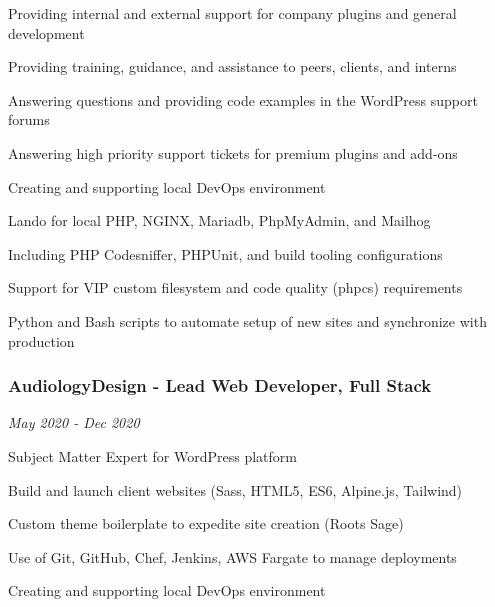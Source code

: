 \documentclass{article}
\newenvironment{narrow_list}{
	\begin{itemize}
		\setlength{\itemsep}{0pt}
		\setlength{\parskip}{-1pt}
		\setlength{\parsep}{0pt}
	}{\end{itemize}
}
\begin{document}
	Providing internal and external support for company plugins and general development 

	\begin{narrow_list}
		\item Providing training, guidance, and assistance to peers, clients, and interns
		\item Answering questions and providing code examples in the WordPress support forums
		\item Answering high priority support tickets for premium plugins and add-ons
	\end{narrow_list}

	Creating and supporting local DevOps environment

	\begin{narrow_list}
		\item Lando for local PHP, NGINX, Mariadb, PhpMyAdmin, and Mailhog
		\item Including PHP Codesniffer, PHPUnit, and build tooling configurations
		\item Support for VIP custom filesystem and code quality (phpcs) requirements
		\item Python and Bash scripts to automate setup of new sites and synchronize with production
	\end{narrow_list}


	\vspace{2mm}

	\subsubsection*{AudiologyDesign - Lead Web Developer, Full Stack}

	\vspace{-1.5mm}

	\textit{May 2020 - Dec 2020}

	Subject Matter Expert for WordPress platform

	\begin{narrow_list}
		\item Build and launch client websites (Sass, HTML5, ES6, Alpine.js, Tailwind)
		\item Custom theme boilerplate to expedite site creation (Roots Sage)
		\item Use of Git, GitHub, Chef, Jenkins, AWS Fargate to manage deployments
	\end{narrow_list}

	Creating and supporting local DevOps environment
\end{document}

